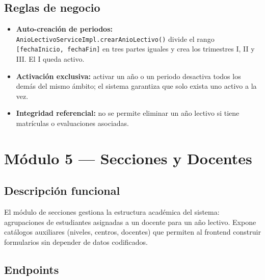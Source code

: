 \documentclass[11pt,a4paper,oneside]{article}
\newcommand{\code}[1]{\texttt{\small #1}}
\begin{document}
\subsection{Reglas de negocio}

\begin{ataraInfo}
\begin{itemize}[leftmargin=*]
  \item \textbf{Auto-creación de periodos:} \code{AnioLectivoServiceImpl.crearAnioLectivo()}
        divide el rango \code{[fechaInicio, fechaFin]} en tres partes iguales y crea los
        trimestres I, II y III. El I queda activo.
  \item \textbf{Activación exclusiva:} activar un año o un periodo desactiva todos los demás
        del mismo ámbito; el sistema garantiza que solo exista uno activo a la vez.
  \item \textbf{Integridad referencial:} no se permite eliminar un año lectivo si tiene
        matrículas o evaluaciones asociadas.
\end{itemize}
\end{ataraInfo}

\section{Módulo 5 — Secciones y Docentes}

\subsection{Descripción funcional}

El módulo de secciones gestiona la estructura académica del sistema: agrupaciones de
estudiantes asignadas a un docente para un año lectivo. Expone catálogos auxiliares
(niveles, centros, docentes) que permiten al frontend construir formularios sin depender
de datos codificados.

\subsection{Endpoints}
\end{document}
